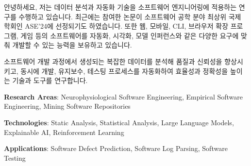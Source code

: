 \begin{cvletter}
    
    안녕하세요, 저는 데이터 분석과 자동화 기술을 소프트웨어 엔지니어링에 적용하는 연구를 수행하고 있습니다. 최근에는 참여한 논문이 소프트웨어 공학 분야 최상위 국제 학회인 ASE’24에 선정되기도 하였습니다. 또한 웹, 모바일, CLI, 브라우저 확장 프로그램, 게임 등의 소프트웨어를 자동화, 시각화, 모델 인퍼런스와 같은 다양한 요구에 맞춰 개발할 수 있는 능력을 보유하고 있습니다.

    

    소프트웨어 개발 과정에서 생성되는 복잡한 데이터를 분석해 품질과 신뢰성을 향상시키고, 동시에 개발, 유지보수, 테스팅 프로세스를 자동화하여 효율성과 정확성을 높이는 기술과 도구를 연구합니다.
    \vspace{2.0mm}
    \begin{cvitems}
        \item \textbf{Research Areas}: Neurophysiological Software Engineering, Empirical Software Engineering, Mining Software Repositories
        \item \textbf{Technologies}: Static Analysis, Statistical Analysis, Large Language Models, Explainable AI, Reinforcement Learning
        \item \textbf{Applications}: Software Defect Prediction, Software Log Parsing, Software Testing
    \end{cvitems}
    \vspace{2.0mm}
\end{cvletter}

